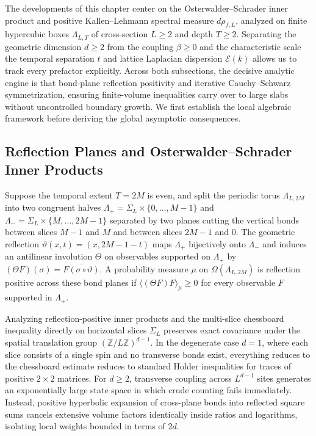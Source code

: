\documentclass[11pt]{article}
\theoremstyle{definition}
\begin{document}
The developments of this chapter center on the Osterwalder--Schrader inner product
and positive Kallen--Lehmann spectral measure $d\rho_{f,L}$, analyzed on finite
hypercubic boxes $\Lambda_{L,T}$ of cross-section $L \ge 2$ and depth $T \ge 2$.
Separating the geometric dimension $d \ge 2$ from the coupling $\beta \ge 0$ and the
characteristic scale the temporal separation $t$ and lattice Laplacian dispersion
$\mathcal{E}(k)$ allows us to track every prefactor explicitly. Across both
subsections, the decisive analytic engine is that bond-plane reflection positivity
and iterative Cauchy--Schwarz symmetrization, ensuring finite-volume inequalities
carry over to large slabs without uncontrolled boundary growth. We first establish
the local algebraic framework before deriving the global asymptotic consequences.

\subsection{Reflection Planes and Osterwalder--Schrader Inner Products}
\label{subsec:s06a}

Suppose the temporal extent $T = 2M$ is even, and split the periodic torus
$\Lambda_{L, 2M}$ into two congruent halves $\Lambda_+ = \Sigma_L \times \{0, \dots,
M-1\}$ and $\Lambda_- = \Sigma_L \times \{M, \dots, 2M-1\}$ separated by two planes
cutting the vertical bonds between slices $M - 1$ and $M$ and between slices $2M -
1$ and $0$. The geometric reflection $\vartheta(x, t) = (x, 2M - 1 - t)$ maps
$\Lambda_+$ bijectively onto $\Lambda_-$ and induces an antilinear involution
$\Theta$ on observables supported on $\Lambda_+$ by $(\Theta F)(\sigma) =
\overline{F(\sigma \circ \vartheta)}$. A probability measure $\mu$ on
$\Omega(\Lambda_{L, 2M})$ is reflection positive across these bond planes if
$\langle (\Theta F) F \rangle_\mu \ge 0$ for every observable $F$ supported in
$\Lambda_+$.

Analyzing reflection-positive inner products and the multi-slice chessboard
inequality directly on horizontal slices $\Sigma_L$ preserves exact covariance under
the spatial translation group $(\mathbb{Z}/L\mathbb{Z})^{d-1}$. In the degenerate
case $d = 1$, where each slice consists of a single spin and no transverse bonds
exist, everything reduces to the chessboard estimate reduces to standard Holder
inequalities for traces of positive $2 \times 2$ matrices. For $d \ge 2$, transverse
coupling across $L^{d-1}$ sites generates an exponentially large state space in
which crude counting fails immediately. Instead, positive hyperbolic expansion of
cross-plane bonds into reflected square sums cancels extensive volume factors
identically inside ratios and logarithms, isolating local weights bounded in terms
of $2d$.
\end{document}
